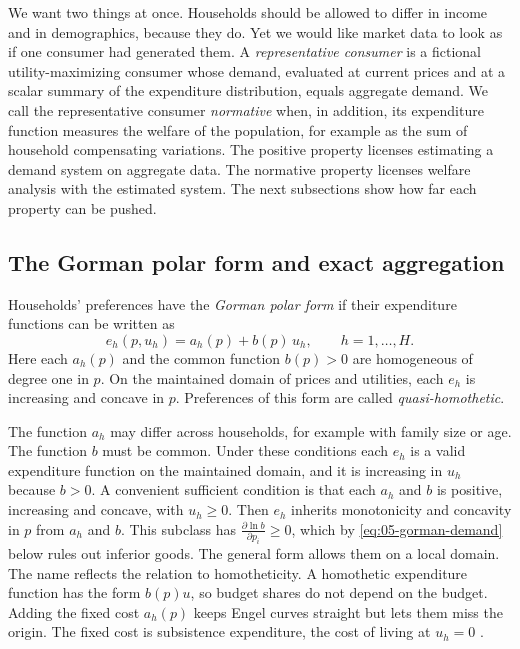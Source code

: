 We want two things at once. Households should be allowed to differ in income and in demographics,
because they do. Yet we would like market data to look as if one consumer had generated them. A
\emph{representative consumer} is a fictional utility-maximizing consumer whose demand, evaluated at
current prices and at a scalar summary of the expenditure distribution, equals aggregate demand. We call
the representative consumer \emph{normative} when, in addition, its expenditure function measures the
welfare of the population, for example as the sum of household compensating variations. The positive
property licenses estimating a demand system on aggregate data. The normative property licenses welfare
analysis with the estimated system. The next subsections show how far each property can be pushed.

\subsection{The Gorman polar form and exact aggregation}\label{sec:05-gorman}

\begin{definition}\label{def:05-gorman}
Households' preferences have the \emph{Gorman polar form} if their expenditure functions can be written
as
\begin{equation}\label{eq:05-gorman-form}
  e_h(p, u_h) = a_h(p) + b(p)\, u_h , \qquad h = 1, \dots, H.
\end{equation}
Here each $a_h(p)$ and the common function $b(p) > 0$ are homogeneous of degree one in $p$. On the
maintained domain of prices and utilities, each $e_h$ is increasing and concave in $p$. Preferences of
this form are called \emph{quasi-homothetic}.
\end{definition}

The function $a_h$ may differ across households, for example with family size or age. The function $b$
must be common. Under these conditions each $e_h$ is a valid expenditure function on the maintained
domain, and it is increasing in $u_h$ because $b > 0$. A convenient sufficient condition is that each
$a_h$ and $b$ is positive, increasing and concave, with $u_h \ge 0$. Then $e_h$ inherits monotonicity and
concavity in $p$ from $a_h$ and $b$. This subclass has $\frac{\partial \ln b}{\partial p_i} \ge 0$, which
by \eqref{eq:05-gorman-demand} below rules out inferior goods. The general form allows them on a local
domain. The name
reflects the relation to homotheticity. A homothetic expenditure function has the form $b(p)u$, so
budget shares do not depend on the budget. Adding the fixed cost $a_h(p)$ keeps Engel curves straight
but lets them miss the origin. The fixed cost is subsistence expenditure, the cost of living at $u_h = 0$
\citep[\S 5.4, pp.~142--144, and \S 6.1, eqs.~1.4--1.7, pp.~150--151]{DeatonMuellbauer1980b}.


